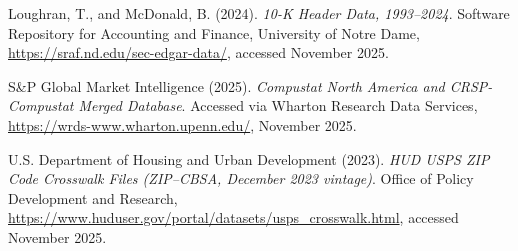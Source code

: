 \documentclass[
  12pt,
]{article}
\begin{document}
Loughran, T., and McDonald, B. (2024). \emph{10-K Header Data,
1993--2024}. Software Repository for Accounting and Finance, University
of Notre Dame, \url{https://sraf.nd.edu/sec-edgar-data/}, accessed
November 2025.

S\&P Global Market Intelligence (2025). \emph{Compustat North America
and CRSP-Compustat Merged Database}. Accessed via Wharton Research Data
Services, \url{https://wrds-www.wharton.upenn.edu/}, November 2025.

U.S. Department of Housing and Urban Development (2023). \emph{HUD USPS
ZIP Code Crosswalk Files (ZIP--CBSA, December 2023 vintage)}. Office of
Policy Development and Research,
\url{https://www.huduser.gov/portal/datasets/usps_crosswalk.html},
accessed November 2025.
\end{document}
